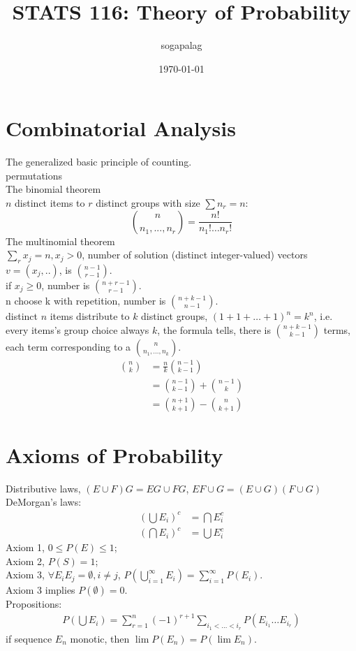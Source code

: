 \documentclass[paper=a4, fontsize=11pt]{scrartcl} %
\title{STATS 116: Theory of Probability}
\author{sogapalag}
\date{\normalsize\today}
\numberwithin{equation}{section} %
\numberwithin{figure}{section} %
\numberwithin{table}{section} %
\begin{document}
\maketitle

\section{Combinatorial Analysis}
The generalized basic principle of counting.\\
permutations\\
The binomial theorem\\
$n$ distinct items to $r$ distinct groups with size $\sum n_r = n$:
\begin{equation}
	{n \choose {n_1,...,n_r}} = \frac{n!}{n_1!\dots n_r!}
\end{equation}
The multinomial theorem\\
$\sum_r x_j = n, x_j>0$, number of solution (distinct integer-valued) vectors $v=(x_j,..)$, is ${n-1 \choose r-1}$.\\
if $x_j\geq 0$, number is ${n+r-1 \choose r-1}$.\\
n choose k with repetition, number is ${n+k-1 \choose n-1}$.\\
distinct $n$ items distribute to $k$ distinct groups, $(1+1+\dots+1)^n=k^n$, i.e. every items's group choice always $k$, the formula tells, there is ${n+k-1 \choose k-1}$ terms, each term corresponding to a ${n \choose {n_1,...,n_k}}$.\\
\begin{align}
	{n\choose k } &= \frac{n}{k} {n-1\choose k-1}\\
	&= {n-1 \choose k-1} + {n-1 \choose k} \\
	&= {n+1 \choose k+1} - {n\choose k+1}
\end{align}

\section{Axioms of Probability}
Distributive laws, $(E\cup F) G = EG\cup FG$, $EF\cup G = (E\cup G)(F\cup G)$\\
DeMorgan's laws:
\begin{align}
	\left( \bigcup E_i \right)^c &= \bigcap E_i^c \\
	\left( \bigcap E_i \right)^c &= \bigcup E_i^c
\end{align}
Axiom 1, $0\leq P(E) \leq 1$;\\
Axiom 2, $P(S)=1$;\\
Axiom 3, $\forall E_iE_j = \emptyset,i\neq j$, $P(\bigcup_{i=1}^\infty E_i) = \sum_{i=1}^\infty P(E_i)$.\\
Axiom 3 implies $P(\emptyset) =0$.\\
Propositions:
\begin{align}
P(\bigcup E_i) = \sum_{r=1}^n (-1)^{r+1} \sum_{i_1<\dots<i_r} P(E_{i_1}\dots E_{i_r}) 
\end{align}
if sequence $E_n$ monotic, then $\lim P(E_n) = P(\lim E_n)$.\\
\end{document}
